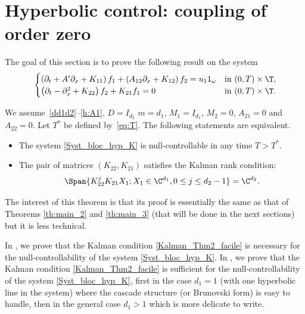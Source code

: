 \section{Hyperbolic control: coupling of order zero}
\label{sec:cont_parab_simple}

The goal of this section is to prove the following result on the system
\begin{equation} \label{Syst_bloc_hyp_K}
\begin{cases}
\left(\partial_t +A'\partial_x+K_{11}\right)f_1+\left(A_{12}\partial_x+K_{12}\right)f_2= u_1 1_\omega
&\text{in}\ (0,T)\times \T,\!\\
\left(\partial_t -\partial_x^2+K_{22}\right)f_2 + K_{21} f_1 = 0 &\text{in}\ (0,T)\times \T.\!\\
\end{cases}
\end{equation}

\begin{theorem} \label{th:main_2_facile}
We assume~\eqref{dd1d2}--\eqref{h:A1}, $D\!=\!I_{d_2}$ $m\!=\!d_1$, $M_1\!=\!I_{d_1}$, $M_2\!=\!0$, $A_{21}\!=\!0$ and $A_{22}=0$. Let $T^\ast$ be defined by~\eqref{eq:T}.
The following statements are equivalent.
\begin{itemize}
\item The system \eqref{Syst_bloc_hyp_K} is null-controllable in any time $T>T^{\ast}$.
\item The pair of matrices $(K_{22},K_{21})$ satisfies the Kalman rank condition:
\begin{equation} \label{Kalman_Thm2_facile}
\Span \{ K_{22}^j K_{21} X_1 ; X_1 \in \C^{d_1}, 0 \leq j \leq d_2-1 \} = \C^{d_2}.
\end{equation}
\end{itemize}
\end{theorem}

The interest of this theorem is that its proof is essentially the same as that of Theorems \ref{th:main_2} and \ref{th:main_3} (that will be done in the next sections) but it is less technical.

In , we prove that the Kalman condition \eqref{Kalman_Thm2_facile} is necessary for the null-controllability of the system \eqref{Syst_bloc_hyp_K}. In , we prove that the Kalman condition \eqref{Kalman_Thm2_facile} is sufficient for the null-controllability of the system \eqref{Syst_bloc_hyp_K}, first in the case $d_1=1$ (\ie with one hyperbolic line in the system) where the cascade structure (or Brunovski form) is easy to handle, then in the general case $d_1>1$ which is more delicate to write.

